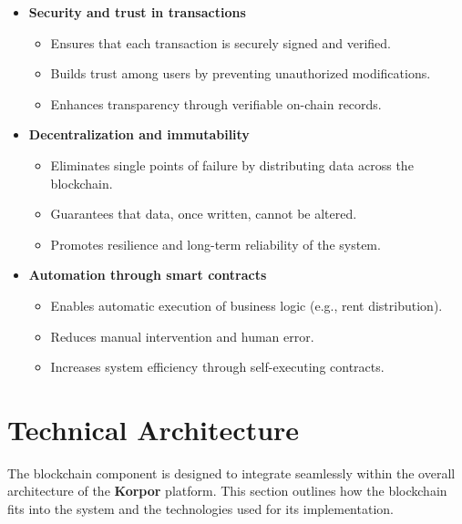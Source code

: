 \begin{itemize}
    \item \textbf{Security and trust in transactions}
    \begin{itemize}
        \item Ensures that each transaction is securely signed and verified.
        \item Builds trust among users by preventing unauthorized modifications.
        \item Enhances transparency through verifiable on-chain records.
    \end{itemize}

    \item \textbf{Decentralization and immutability}
    \begin{itemize}
        \item Eliminates single points of failure by distributing data across the blockchain.
        \item Guarantees that data, once written, cannot be altered.
        \item Promotes resilience and long-term reliability of the system.
    \end{itemize}

    \item \textbf{Automation through smart contracts}
    \begin{itemize}
        \item Enables automatic execution of business logic (e.g., rent distribution).
        \item Reduces manual intervention and human error.
        \item Increases system efficiency through self-executing contracts.
    \end{itemize}
\end{itemize}

\section{Technical Architecture}

The blockchain component is designed to integrate seamlessly within the overall architecture of the \textbf{\textcolor{primary}{Korpor}} platform. This section outlines how the blockchain fits into the system and the technologies used for its implementation.

